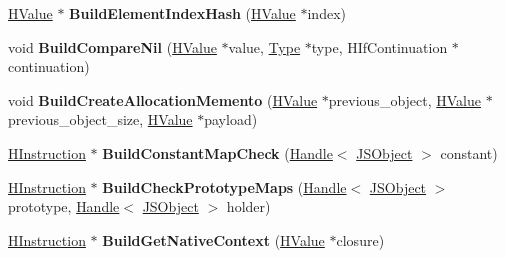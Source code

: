 \begin{DoxyCompactItemize}
\item 
\hypertarget{classv8_1_1internal_1_1_h_graph_builder_a2aef5fb1df007ee7a930ca88ea9ebfd3}{}\hyperlink{classv8_1_1internal_1_1_h_value}{H\+Value} $\ast$ {\bfseries Build\+Element\+Index\+Hash} (\hyperlink{classv8_1_1internal_1_1_h_value}{H\+Value} $\ast$index)\label{classv8_1_1internal_1_1_h_graph_builder_a2aef5fb1df007ee7a930ca88ea9ebfd3}

\item 
\hypertarget{classv8_1_1internal_1_1_h_graph_builder_abb7b7398ff9e2352d44a8f07b7d81169}{}void {\bfseries Build\+Compare\+Nil} (\hyperlink{classv8_1_1internal_1_1_h_value}{H\+Value} $\ast$value, \hyperlink{classv8_1_1internal_1_1_type_impl}{Type} $\ast$type, H\+If\+Continuation $\ast$continuation)\label{classv8_1_1internal_1_1_h_graph_builder_abb7b7398ff9e2352d44a8f07b7d81169}

\item 
\hypertarget{classv8_1_1internal_1_1_h_graph_builder_a581229d30d640590339529d79a90dc47}{}void {\bfseries Build\+Create\+Allocation\+Memento} (\hyperlink{classv8_1_1internal_1_1_h_value}{H\+Value} $\ast$previous\+\_\+object, \hyperlink{classv8_1_1internal_1_1_h_value}{H\+Value} $\ast$previous\+\_\+object\+\_\+size, \hyperlink{classv8_1_1internal_1_1_h_value}{H\+Value} $\ast$payload)\label{classv8_1_1internal_1_1_h_graph_builder_a581229d30d640590339529d79a90dc47}

\item 
\hypertarget{classv8_1_1internal_1_1_h_graph_builder_ab081bd0afb68c40db6b629b24e6988e0}{}\hyperlink{classv8_1_1internal_1_1_h_instruction}{H\+Instruction} $\ast$ {\bfseries Build\+Constant\+Map\+Check} (\hyperlink{classv8_1_1internal_1_1_handle}{Handle}$<$ \hyperlink{classv8_1_1internal_1_1_j_s_object}{J\+S\+Object} $>$ constant)\label{classv8_1_1internal_1_1_h_graph_builder_ab081bd0afb68c40db6b629b24e6988e0}

\item 
\hypertarget{classv8_1_1internal_1_1_h_graph_builder_a6f475f92c21330451d9cdc37b4e3952a}{}\hyperlink{classv8_1_1internal_1_1_h_instruction}{H\+Instruction} $\ast$ {\bfseries Build\+Check\+Prototype\+Maps} (\hyperlink{classv8_1_1internal_1_1_handle}{Handle}$<$ \hyperlink{classv8_1_1internal_1_1_j_s_object}{J\+S\+Object} $>$ prototype, \hyperlink{classv8_1_1internal_1_1_handle}{Handle}$<$ \hyperlink{classv8_1_1internal_1_1_j_s_object}{J\+S\+Object} $>$ holder)\label{classv8_1_1internal_1_1_h_graph_builder_a6f475f92c21330451d9cdc37b4e3952a}

\item 
\hypertarget{classv8_1_1internal_1_1_h_graph_builder_a6e875339aaaa41090cddbf127dc14a4d}{}\hyperlink{classv8_1_1internal_1_1_h_instruction}{H\+Instruction} $\ast$ {\bfseries Build\+Get\+Native\+Context} (\hyperlink{classv8_1_1internal_1_1_h_value}{H\+Value} $\ast$closure)\label{classv8_1_1internal_1_1_h_graph_builder_a6e875339aaaa41090cddbf127dc14a4d}


\end{DoxyCompactItemize}
